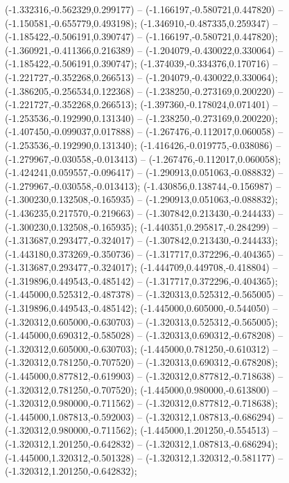  (-1.332316,-0.562329,0.299177) -- (-1.166197,-0.580721,0.447820) -- (-1.150581,-0.655779,0.493198);
 (-1.346910,-0.487335,0.259347) -- (-1.185422,-0.506191,0.390747) -- (-1.166197,-0.580721,0.447820);
 (-1.360921,-0.411366,0.216389) -- (-1.204079,-0.430022,0.330064) -- (-1.185422,-0.506191,0.390747);
 (-1.374039,-0.334376,0.170716) -- (-1.221727,-0.352268,0.266513) -- (-1.204079,-0.430022,0.330064);
 (-1.386205,-0.256534,0.122368) -- (-1.238250,-0.273169,0.200220) -- (-1.221727,-0.352268,0.266513);
 (-1.397360,-0.178024,0.071401) -- (-1.253536,-0.192990,0.131340) -- (-1.238250,-0.273169,0.200220);
 (-1.407450,-0.099037,0.017888) -- (-1.267476,-0.112017,0.060058) -- (-1.253536,-0.192990,0.131340);
 (-1.416426,-0.019775,-0.038086) -- (-1.279967,-0.030558,-0.013413) -- (-1.267476,-0.112017,0.060058);
 (-1.424241,0.059557,-0.096417) -- (-1.290913,0.051063,-0.088832) -- (-1.279967,-0.030558,-0.013413);
 (-1.430856,0.138744,-0.156987) -- (-1.300230,0.132508,-0.165935) -- (-1.290913,0.051063,-0.088832);
 (-1.436235,0.217570,-0.219663) -- (-1.307842,0.213430,-0.244433) -- (-1.300230,0.132508,-0.165935);
 (-1.440351,0.295817,-0.284299) -- (-1.313687,0.293477,-0.324017) -- (-1.307842,0.213430,-0.244433);
 (-1.443180,0.373269,-0.350736) -- (-1.317717,0.372296,-0.404365) -- (-1.313687,0.293477,-0.324017);
 (-1.444709,0.449708,-0.418804) -- (-1.319896,0.449543,-0.485142) -- (-1.317717,0.372296,-0.404365);
 (-1.445000,0.525312,-0.487378) -- (-1.320313,0.525312,-0.565005) -- (-1.319896,0.449543,-0.485142);
 (-1.445000,0.605000,-0.544050) -- (-1.320312,0.605000,-0.630703) -- (-1.320313,0.525312,-0.565005);
 (-1.445000,0.690312,-0.585028) -- (-1.320313,0.690312,-0.678208) -- (-1.320312,0.605000,-0.630703);
 (-1.445000,0.781250,-0.610312) -- (-1.320312,0.781250,-0.707520) -- (-1.320313,0.690312,-0.678208);
 (-1.445000,0.877812,-0.619903) -- (-1.320312,0.877812,-0.718638) -- (-1.320312,0.781250,-0.707520);
 (-1.445000,0.980000,-0.613800) -- (-1.320312,0.980000,-0.711562) -- (-1.320312,0.877812,-0.718638);
 (-1.445000,1.087813,-0.592003) -- (-1.320312,1.087813,-0.686294) -- (-1.320312,0.980000,-0.711562);
 (-1.445000,1.201250,-0.554513) -- (-1.320312,1.201250,-0.642832) -- (-1.320312,1.087813,-0.686294);
 (-1.445000,1.320312,-0.501328) -- (-1.320312,1.320312,-0.581177) -- (-1.320312,1.201250,-0.642832);
